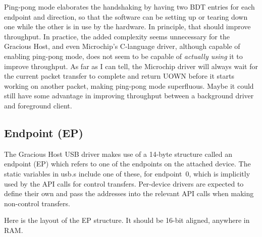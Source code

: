 Ping-pong mode elaborates the handshaking by having two BDT entries
for each endpoint and direction, so that the software can be setting up or
tearing down one while the other is in use by the hardware.  In principle,
that should improve throughput.  In practice, the added complexity seems
unnecessary for the Gracious Host, and even Microchip's C-language driver,
although capable of enabling ping-pong mode, does not seem to be capable of
\emph{actually using} it to improve throughput.  As far as I can tell, the
Microchip driver will always wait for the current packet transfer to
complete and return UOWN before it starts working on another packet, making
ping-pong mode superfluous.  Maybe it could still have some advantage in
improving throughput between a background driver and foreground client.

\subsection{Endpoint (EP)}

The Gracious Host USB driver makes use of a 14-byte structure called an
endpoint (EP) which refers to one of the endpoints on the attached device. 
The static variables in usb.s include one of these, for endpoint~0, which is
implicitly used by the API calls for control transfers.  Per-device drivers
are expected to define their own and pass the addresses into the relevant
API calls when making non-control transfers.

Here is the layout of the EP structure.  It should be 16-bit aligned,
anywhere in RAM.


